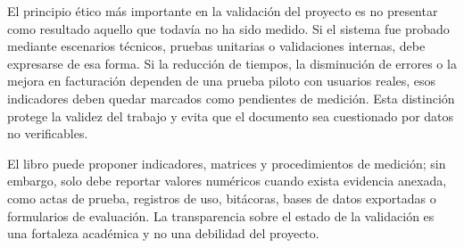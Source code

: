 El principio ético más importante en la validación del proyecto es no presentar como resultado aquello que todavía no ha sido medido. Si el sistema fue probado mediante escenarios técnicos, pruebas unitarias o validaciones internas, debe expresarse de esa forma. Si la reducción de tiempos, la disminución de errores o la mejora en facturación dependen de una prueba piloto con usuarios reales, esos indicadores deben quedar marcados como pendientes de medición. Esta distinción protege la validez del trabajo y evita que el documento sea cuestionado por datos no verificables.

El libro puede proponer indicadores, matrices y procedimientos de medición; sin embargo, solo debe reportar valores numéricos cuando exista evidencia anexada, como actas de prueba, registros de uso, bitácoras, bases de datos exportadas o formularios de evaluación. La transparencia sobre el estado de la validación es una fortaleza académica y no una debilidad del proyecto.
